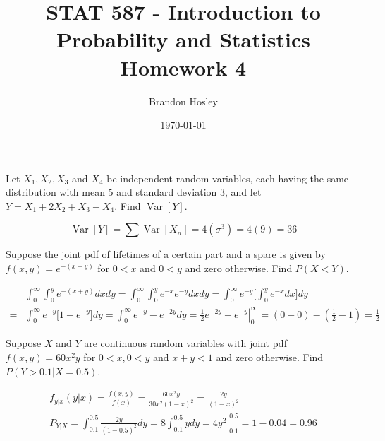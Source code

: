 \documentclass[answers]{exam}
\title{STAT 587 - Introduction to Probability and Statistics%
	\\ Homework 4}
\author{Brandon Hosley}
\date{\today}
\begin{document}
\maketitle
\begin{questions}

\question 
Let \(X_1,X_2,X_3\) and \(X_4\) be independent random variables, each having the same distribution with mean 5 and standard deviation 3, and let \(Y = X_1+2X_2+X_3-X_4\). Find \(\operatorname{Var}[Y]\).
\begin{solution}
	\[
	\operatorname{Var}[Y] = \sum\operatorname{Var}[X_n] = 4(\sigma^3) = 4(9) = 36
	\]
\end{solution}

\question 
Suppose the joint pdf of lifetimes of a certain part and a spare is given by \(f(x,y) =e^{-(x+y)}\)
for \(0 < x\) and \(0 < y\) and zero otherwise. Find \(P(X<Y)\).
\begin{solution}
	\begin{align*}
		& \int_{0}^{\infty} \int_{0}^{y} e^{-(x+y)} dx dy
		= \int_{0}^{\infty} \int_{0}^{y} e^{-x} e^{-y} dx dy
		= \int_{0}^{\infty} e^{-y} \big[ \int_{0}^{y} e^{-x} dx \big] dy
		\\=& \int_{0}^{\infty} e^{-y} \big[ 1-e^{-y} \big] dy
		= \int_{0}^{\infty} e^{-y}-e^{-2y} dy
		= \left. \frac{1}{2}e^{-2y}-e^{-y} \right|_0^\infty
		= (0-0)-(\frac{1}{2}-1)
		= \frac{1}{2}
	\end{align*}
\end{solution}

\question 
Suppose $X$ and $Y$ are continuous random variables with joint pdf \(f(x,y) = 60x^2y\)
for \(0<x,0<y\) and \(x+y<1\) and zero otherwise. Find \(P(Y > 0.1 | X = 0.5)\).
\begin{solution}
	\begin{align*}
		f_{y|x}(y|x) 
		= \frac{f(x,y)}{f(x)} 
		= \frac{60x^2y}{30x^2(1-x)^2}
		= \frac{2y}{(1-x)^2} 
		\\
		P_{Y|X} 
		= \int_{0.1}^{0.5} \frac{2y}{(1-0.5)^2} dy
		= 8\int_{0.1}^{0.5} y dy
		= \left. 4y^2 \right|_{0.1}^{0.5}
		= 1 - 0.04 = 0.96
	\end{align*}
\end{solution}


\end{questions}
\end{document}
